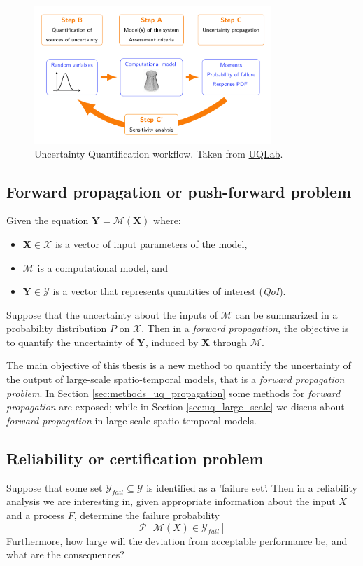\begin{figure}[H]
    \centering
    \includegraphics[width=0.8\textwidth]{img/background/UQ_steps.png}
    \caption{Uncertainty Quantification workflow. Taken from \href{http://www.uqlab.com/}{UQLab}.}
    \label{fig:uqlab_workflow}
\end{figure}

\subsection{Forward propagation or push-forward problem}\label{seq:forward}
Given the equation $\bm{Y}=\mathcal{M}(\bm{X})$ where: 
\begin{itemize}
\item $\bm{X} \in \mathcal{X} $ is a vector of  input parameters of the model,
\item $\mathcal{M}$ is a computational model, and
\item $\bm{Y} \in \mathcal{Y}$ is a vector that represents  quantities of interest (\textit{QoI}).
\end{itemize}
Suppose that the uncertainty about the inputs of $\mathcal{M}$ can be summarized in a probability distribution $P$ on $\mathcal{X}$. Then in a \textit{forward propagation}, the objective is to quantify the uncertainty of $\bm{Y}$, induced by $\bm{X}$ through $\mathcal{M}$.

The main objective of this thesis is a new method to quantify the uncertainty of the output of large-scale spatio-temporal models, that is a \textit{forward propagation problem}. In Section \ref{sec:methods_uq_propagation} some methods for \textit{forward propagation} are exposed; while in Section \ref{sec:uq_large_scale} we discus about \textit{forward propagation} in large-scale spatio-temporal models.  

\subsection{Reliability or certification problem}\label{seq:reliability}
Suppose that some set $\mathcal{Y}_{fail}\subseteq \mathcal{Y}$ is identified as a 'failure set'. Then in a reliability analysis we are interesting in, given appropriate information about the input $X$ and a process $F$, determine the failure probability 
\begin{equation}
\mathcal{P}[\mathcal{M}(X)\in \mathcal{Y}_{fail}]
\end{equation}
Furthermore, how large will the deviation from acceptable performance be, and what are the consequences? \cite{Sullivan2015}


